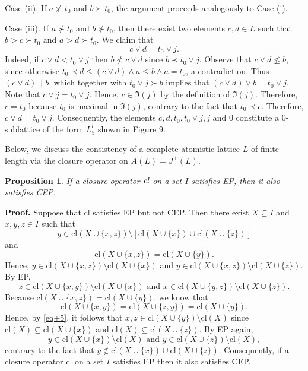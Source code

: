 \documentclass[12pt]{article}
\newtheorem{proposition}{\bf Proposition}[section]
\def\QEDopen{{\setlength{\fboxsep}{0pt}\setlength{\fboxrule}{0.2pt}\fbox{\rule[0pt]{0pt}{1.3ex}\rule[0pt]{1.3ex}{0pt}}}}
\def\QED{\QEDopen}
\def\proof{{\bf Proof.} }
\def\endproof{\hspace*{\fill}~\QED\par\endtrivlist\unskip}
\begin{document}
Case (ii). If $a\nsucc t_0$ and $b\succ t_0$, the argument proceeds analogously to Case (i).

Case (iii). If $a\nsucc t_0$ and $b\nsucc t_0$, then there exist two elements $c,d\in L$ such that $b>c\succ t_0$ and $a>d\succ t_0$. We claim that $$c\vee d=t_0\vee j.$$ 
Indeed, if $c\vee d<t_0\vee j$ then $b\nless c\vee d$ since $b\prec t_0\vee j$. Observe that $c\vee d\nleq b$, since otherwise $t_0\prec d\leq (c\vee d)\wedge a\leq b\wedge a=t_0$, a contradiction. 
Thus $(c\vee d)\parallel b$, which together with $t_0\vee j\succ b$ implies that $(c\vee d)\vee b=t_0\vee j$. Note that $c\vee j=t_0\vee j$. Hence, $c\in \Im(j)$ by the definition of $\Im(j)$. 
Therefore, $c=t_0$ because $t_0$ is maximal in $\Im(j)$, contrary to the fact that $t_0\prec c$. 
Therefore, $c\vee d=t_0\vee j$. Consequently, the elements $c, d, t_0, t_0\vee j, j$ and $0$ constitute a $0$-sublattice of the form $L^{l}_{5}$ shown in Figure 9.
\endproof

Below, we discuss the consistency of a complete atomistic lattice $L$ of finite length via the closure operator on $A(L)=J^{+}(L)$. 

\begin{proposition}\label{P01}
If a closure operator $\emph{cl}$ on a set $I$ satisfies EP, then it also satisfies CEP.
\end{proposition}
\proof
Suppose that $\mbox{cl}$ satisfies EP but not CEP. Then there exist $X\subseteq I$ and $x, y, z\in I$ such that
$$y\in \mbox{cl}(X\cup\{x,z\}) \setminus [\mbox{cl}(X\cup\{x\})\cup \mbox{cl}(X\cup \{z\})]$$  
and 
$$\mbox{cl}(X\cup\{x,z\})=\mbox{cl}(X\cup\{y\}).$$
Hence, $y\in \mbox{cl}(X\cup\{x,z\})\setminus \mbox{cl}(X\cup\{x\})$ and $y\in \mbox{cl}(X\cup\{x,z\})\setminus \mbox{cl}(X\cup\{z\})$. By EP, 
\begin{equation}\label{eq+5}
z\in \mbox{cl}(X\cup\{x,y\})\setminus \mbox{cl}(X\cup\{x\}) \mbox{ and } x\in \mbox{cl}(X\cup\{y,z\})\setminus \mbox{cl}(X\cup\{z\}). \end{equation}
Because $\mbox{cl}(X\cup\{x,z\})= \mbox{cl}(X\cup\{y\})$, we know that $$\mbox{cl}(X\cup\{x,y\})=\mbox{cl}(X\cup\{z,y\})=\mbox{cl}(X\cup\{y\}).$$
Hence, by \eqref{eq+5}, it follows that $x, z\in \mbox{cl}(X\cup \{y\}) \setminus \mbox{cl}(X)$ since $\mbox{cl}(X) \subseteq \mbox{cl}(X\cup\{x\})$ and $\mbox{cl}(X) \subseteq \mbox{cl}(X\cup\{z\})$. By EP again,
$$y\in \mbox{cl}(X\cup \{x\}) \setminus \mbox{cl}(X)\mbox{ and } y\in \mbox{cl}(X\cup \{z\}) \setminus \mbox{cl}(X),$$
contrary to the fact that $y\notin \mbox{cl}(X\cup \{x\})\cup \mbox{cl}(X\cup \{z\})$.
Consequently, if a closure operator $\mbox{cl}$ on a set $I$ satisfies EP then it also satisfies CEP.
\endproof
\end{document}
